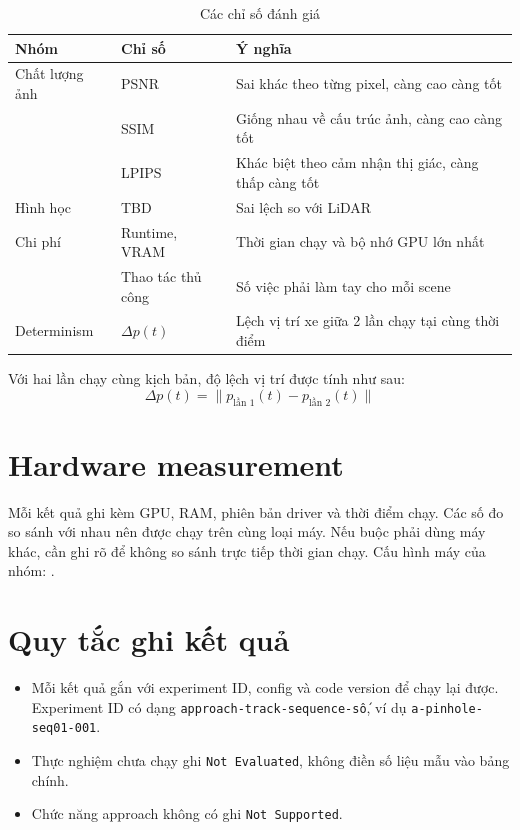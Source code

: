 \begin{table}[H]
  \centering
  \caption{Các chỉ số đánh giá}
  \begin{tabularx}{\linewidth}{>{\raggedright\arraybackslash}p{3.2cm} l X}
    \toprule
    \textbf{Nhóm} & \textbf{Chỉ số} & \textbf{Ý nghĩa} \\
    \midrule
    Chất lượng ảnh & PSNR & Sai khác theo từng pixel, càng cao càng tốt \\
     & SSIM & Giống nhau về cấu trúc ảnh, càng cao càng tốt \\
     & LPIPS & Khác biệt theo cảm nhận thị giác, càng thấp càng tốt \\
    \addlinespace
    Hình học & TBD & Sai lệch so với LiDAR \\
    \addlinespace
    Chi phí & Runtime, VRAM & Thời gian chạy và bộ nhớ GPU lớn nhất \\
     & Thao tác thủ công & Số việc phải làm tay cho mỗi scene \\
    \addlinespace
    Determinism & $\Delta p(t)$ & Lệch vị trí xe giữa 2 lần chạy tại cùng thời điểm \\
    \bottomrule
  \end{tabularx}
\end{table}

Với hai lần chạy cùng kịch bản, độ lệch vị trí được tính như sau:
\begin{equation}
  \Delta p(t) = \lVert p_{\text{lần 1}}(t) - p_{\text{lần 2}}(t) \rVert
\end{equation}

\section{Hardware measurement}

Mỗi kết quả ghi kèm GPU, RAM, phiên bản driver và thời điểm chạy.
Các số đo so sánh với nhau nên được chạy trên cùng loại máy.
Nếu buộc phải dùng máy khác, cần ghi rõ để không so sánh trực tiếp thời gian chạy.
Cấu hình máy của nhóm: .

\section{Quy tắc ghi kết quả}

\begin{itemize}
  \item Mỗi kết quả gắn với experiment ID, config và code version để chạy lại được. Experiment ID có dạng \texttt{approach-track-sequence-số}, ví dụ \texttt{a-pinhole-seq01-001}.
  \item Thực nghiệm chưa chạy ghi \texttt{Not Evaluated}, không điền số liệu mẫu vào bảng chính.
  \item Chức năng approach không có ghi \texttt{Not Supported}.
\end{itemize}

